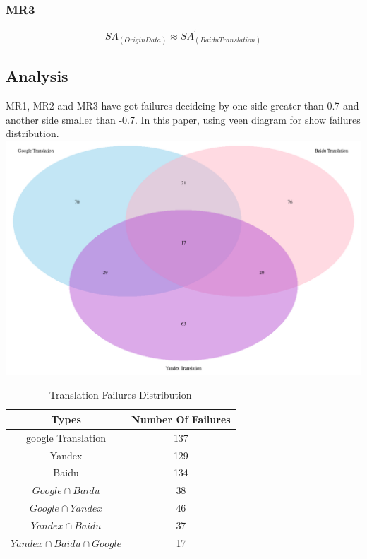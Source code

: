 \documentclass[conference]{IEEEtran}
\begin{document}
\begin{CJK*}{UTF8}{gbsn}
\subsubsection{MR3}
$$SA_{(Origin Data)} \approx SA^{\prime}_{(Baidu Translation)}$$
\subsection{Analysis}
MR1, MR2 and MR3 have got failures decideing by one side greater than 0.7 and
another side smaller than -0.7. In this paper, using veen diagram for show
failures distribution.
\includegraphics[width=0.35\paperwidth]{./img/veen.png}
  \begin{table}[h]
    \caption {Translation Failures Distribution}
    \begin{center}
      \begin{tabular}{|c|c|}
        \hline
        Types & Number Of Failures \\
        \hline\hline
        google Translation & 137\\
        \hline
        Yandex & 129 \\
        \hline
        Baidu & 134 \\
        \hline
        $Google \cap Baidu$ & 38 \\
        \hline
        $Google \cap Yandex$ & 46 \\
        \hline
        $Yandex \cap Baidu$ & 37 \\
        \hline
        $Yandex \cap Baidu \cap Google$ & 17 \\
        \hline
      \end{tabular}
    \end{center}
  \end{table}\\\\


\end{CJK*}
\end{document}
